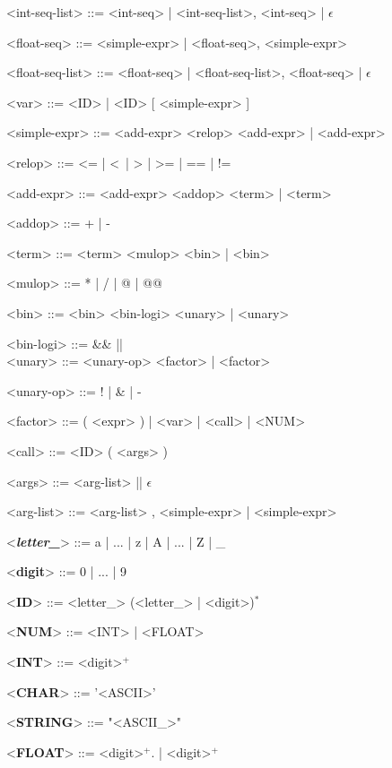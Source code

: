 \begin{grammar}
	<int-seq-list> ::= {<int-seq>} | <int-seq-list>, {<int-seq>} | $\epsilon$

	<float-seq> ::= <simple-expr> | <float-seq>, <simple-expr>
		
	<float-seq-list> ::= {<float-seq>} | <float-seq-list>, {<float-seq>} | $\epsilon$
	
	<var> ::= <ID> | <ID> [ <simple-expr> ]
	
	<simple-expr> ::= <add-expr> <relop> <add-expr> | <add-expr>
	
	<relop> ::= \textless= | \textless\ | > | >= | == | !=
	
	<add-expr> ::= <add-expr> <addop> <term> | <term>
	
	<addop> ::= + | - 
	
	<term> ::= <term> <mulop> <bin> | <bin>
	
	<mulop> ::= * | / | @ | @@
	
	<bin> ::= <bin> <bin-logi> <unary> | <unary>
	
	<bin-logi> ::= \&\& \alt || \alt \^ \\
	
	<unary> ::= <unary-op> <factor> | <factor> 
	
	<unary-op> ::= ! | \& | -
	
	<factor> ::= ( <expr> ) | <var> | <call> | <NUM>
	
	<call> ::= <ID> ( <args> ) 
	
	<args> ::= <arg-list> || $\epsilon$
	
	<arg-list> ::= <arg-list> , <simple-expr> | <simple-expr>
	
	<\textbf{\textit{letter\_}}> ::= a | ... | z | A | ... | Z | \_
	
	<\textbf{digit}> ::= 0 | ... | 9
	
	<\textbf{ID}> ::= <letter\_> (<letter\_> | <digit>)$^*$
	
	<\textbf{NUM}> ::= <INT> | <FLOAT>
	
	<\textbf{INT}> ::= <digit>$^+$

	<\textbf{CHAR}> ::= '<ASCII>'
	
	<\textbf{STRING}> ::= "<ASCII_>"

	<\textbf{FLOAT}> ::= <digit>$^+$. | <digit>$^+$
	
\end{grammar}
